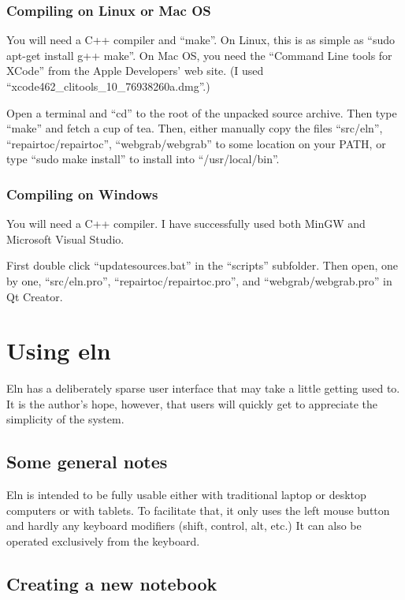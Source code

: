 \documentclass[11pt]{report}
\begin{document}
\subsection{Compiling on Linux or Mac OS}

You will need a C++ compiler and ``make''. On Linux, this is as simple
as ``sudo apt-get install g++ make''. On Mac OS, you need the
``Command Line tools for XCode'' from the Apple Developers' web
site. (I used ``xcode462\_clitools\_10\_76938260a.dmg''.)

Open a terminal and ``cd'' to the root of the unpacked source
archive. Then type ``make'' and fetch a cup of tea. Then, either
manually copy the files ``src/eln'', ``repairtoc/repairtoc'',
``webgrab/webgrab'' to some location on your PATH, or type ``sudo make
install'' to install into ``/usr/local/bin''.

\subsection{Compiling on Windows}
You will need a C++ compiler. I have successfully used both MinGW and
Microsoft Visual Studio.

First double click ``updatesources.bat'' in the
``scripts'' subfolder. Then open, one by one, ``src/eln.pro'',
``repairtoc/repairtoc.pro'', and ``webgrab/webgrab.pro'' in Qt
Creator.  

\chapter{Using eln}

Eln has a deliberately sparse user interface that may take a little
getting used to. It is the author's hope, however, that users will
quickly get to appreciate the simplicity of the system.

\section{Some general notes}

Eln is intended to be fully usable either with traditional laptop or
desktop computers or with tablets. To facilitate that, it only uses
the left mouse button and hardly any keyboard modifiers (shift,
control, alt, etc.) It can also be operated exclusively from the
keyboard.

\section{Creating a new notebook}
\end{document}

